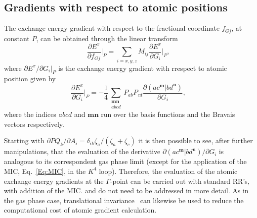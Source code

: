 \documentclass[prl,twocolumn,showpacs,twocolumngrid,superbib]{revtex4}
\begin{document}
\subsection{Gradients with respect to atomic positions}
The exchange energy gradient with respect to the fractional coordinate 
$f_{Gj}$, at constant $P$, can be obtained through the linear transform 
\begin{equation*}
 \frac{\partial E^x}{\partial f_{Gj}}\bigg|_P=\sum_{i=x,y,z}M_{ij}\frac{\partial E^x}{\partial G_i}\bigg|_P,
\end{equation*}
where $\partial E^x/\partial G_i|_P$ is the exchange energy gradient with rrespect to atomic position given by
\begin{equation}\label{Eq:Grad}
  \frac{\partial E^x}{\partial G_i}\bigg|_P =
  -\frac{1}{4}\sum_{\substack{\mathbf{m}\mathbf{n}\\a b c d}}P_{ab}P_{cd}
  \frac{\partial(ac^\mathbf{m}|bd^\mathbf{n})}{\partial G_i},
\end{equation}
where the indices $abcd$ and $\mathbf{mn}$ run over the basis functions and the
Bravais vectors respectively.

Starting with $\partial PQ_k/\partial A_i=\delta_{ik}\zeta_a/(\zeta_a+\zeta_c)$
it is then possible to see, after further manipulations, 
that the evaluation of the derivative $\partial(ac^\mathbf{m}|bd^\mathbf{n})/\partial G_i$
is analogous to its correspondent gas phase
limit (except for the application of the MIC, Eq.~\ref{Eq:MIC}, in the $K^4$ loop). 
Therefore, the evaluation of the atomic exchange energy gradients at the $\Gamma$-point
can be carried out with standard RR's, with addition of the MIC. and do not need to be addressed in more 
detail. As in the gas phase case, translational 
invariance~\cite{AKorminicki77} can likewise be used to reduce the 
computational cost of atomic gradient calculation.
\end{document}
